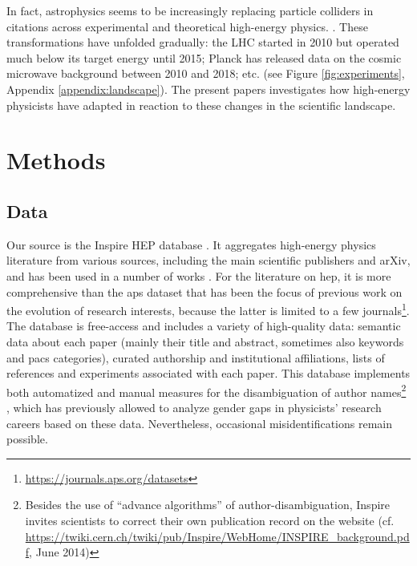 \documentclass{article}
\begin{document}
In fact, astrophysics seems to be increasingly replacing particle colliders in citations across experimental and theoretical high-energy physics.  \citep{Gautheron2023}. These transformations have unfolded gradually: the LHC started in 2010 but operated much below its target energy until 2015; Planck has released data on the cosmic microwave background between 2010 and 2018; etc. (see Figure \ref{fig:experiments}, Appendix \ref{appendix:landscape}). The present papers investigates how high-energy physicists have adapted in reaction to these changes in the scientific landscape.%


\section{\label{sec:methods}Methods}

\subsection{\label{sec:data}Data}

Our source is the Inspire HEP database \citep{InspireAPI}. It aggregates high-energy physics literature from various sources, including the main scientific publishers and arXiv, and has been used in a number of works \citep{Perovi2016,Chall2019a,Strumia2021,Sikimi2022,Gautheron2023}. For the literature on \gls{hep}, it is more comprehensive than the \gls{aps} dataset that has been the focus of previous work on the evolution of research interests, because the latter is limited to a few journals\footnote{\url{https://journals.aps.org/datasets}}. The database is free-access and includes a variety of high-quality data: semantic data about each paper (mainly their title and abstract, sometimes also keywords and \gls{pacs} categories), curated authorship and institutional affiliations, lists of references and experiments associated with each paper. This database implements both automatized and manual measures for the disambiguation of author names\footnote{Besides the use of ``advance algorithms'' of author-disambiguation, Inspire invites scientists to correct their own publication record on the website (cf. \url{https://twiki.cern.ch/twiki/pub/Inspire/WebHome/INSPIRE_background.pdf}, June 2014)} %
, which has previously allowed \citet{Strumia2021} to analyze gender gaps in physicists' research careers based on these data. Nevertheless, occasional misidentifications remain possible. %
\end{document}
